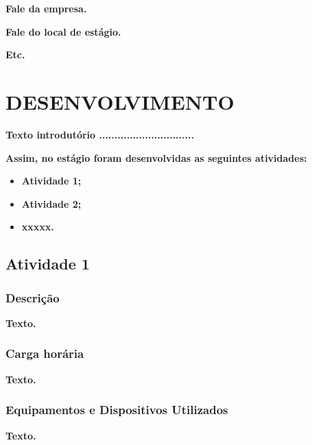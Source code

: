 \documentclass[12pt]{article}
\begin{document}
\begin{justifying}   

    \textbf{Fale da empresa.}
    
    \textbf{Fale do local de estágio.}
    
    \textbf{Etc.}

\end{justifying}

\newpage

\section{DESENVOLVIMENTO}

\begin{justifying}
    \textbf{Texto introdutório ...............................}
    
    \textbf{Assim, no estágio foram desenvolvidas as seguintes atividades:}
\begin{itemize}
    \setlength{\itemindent}{3em}  %
    \item \textbf{Atividade 1;}
    \item \textbf{Atividade 2;}
    \item \textbf{xxxxx.}
\end{itemize}


\end{justifying}

\subsection{Atividade 1}
    \subsubsection{Descrição}
    \begin{justifying}
        \textbf{Texto.}
    \end{justifying}


\subsubsection{Carga horária}
    \begin{justifying}
        \textbf{Texto.}
    \end{justifying}

\subsubsection{Equipamentos e Dispositivos Utilizados}
    \begin{justifying}
        \textbf{Texto.}
    \end{justifying}
\end{document}
